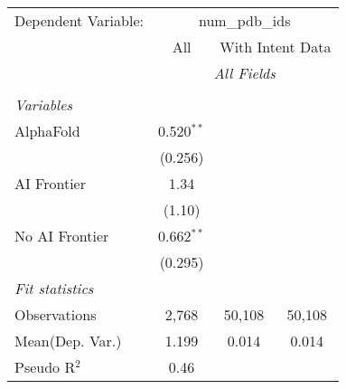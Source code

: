 \begingroup
\centering
\begin{tabular}{lccc}
   \tabularnewline \midrule \midrule
   Dependent Variable: & \multicolumn{3}{c}{num\_pdb\_ids}\\
 & \multicolumn{1}{c}{All} & \multicolumn{2}{c}{With Intent Data} \\
\cmidrule(lr){2-2} \cmidrule(lr){3-4}
 & \multicolumn{3}{c}{\textit{All Fields}} \\ \\
   \emph{Variables}\\
   AlphaFold      & 0.520$^{**}$ &        &   \\   
                  & (0.256)      &        &   \\   
   AI Frontier    & 1.34         &        &   \\   
                  & (1.10)       &        &   \\   
   No AI Frontier & 0.662$^{**}$ &        &   \\   
                  & (0.295)      &        &   \\   
   \midrule
   \emph{Fit statistics}\\
   Observations   & 2,768        & 50,108 & 50,108\\  
Mean(Dep. Var.) & 1.199 & 0.014 & 0.014 \\
   Pseudo R$^2$   & 0.46         &        & \\  
   

\end{tabular}
